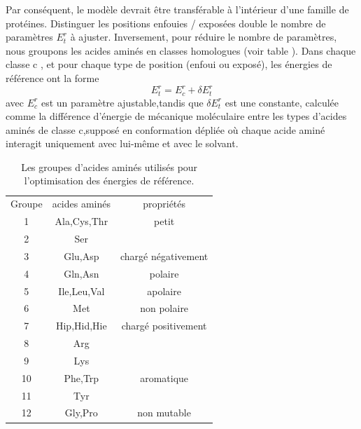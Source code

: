 Par conséquent, le modèle devrait être transférable à l'intérieur d'une famille de protéines. Distinguer les positions enfouies / exposées double le nombre de paramètres $E^r_t$ à ajuster. Inversement, pour réduire le nombre de paramètres, nous groupons les acides aminés en classes homologues (voir table ). Dans chaque classe c , et pour chaque type de position (enfoui ou exposé), les énergies de référence ont la forme
\begin{displaymath}
E^r_t = E^r_c + \delta E^r_t
\end{displaymath}
avec $E^r_c$ est un paramètre ajustable,tandis que $\delta E^r_t$ est une constante, calculée comme la différence d'énergie de mécanique moléculaire entre les types d'acides aminés de classe c,supposé en conformation dépliée où chaque acide aminé interagit uniquement avec lui-même et avec le solvant.

    \begin{table}[!htbp]
      \centering

      \begin{tabular}{ccc}

        \toprule
        Groupe & acides aminés & propriétés\\
        \cmidrule{1-3}

        1   & Ala,Cys,Thr & petit\\
        2   & Ser &\\
        \cmidrule{1-3}
        3   & Glu,Asp & chargé négativement\\
        \cmidrule{1-3}
        4   & Gln,Asn & polaire\\
        \cmidrule{1-3}
        5   & Ile,Leu,Val & apolaire\\
        \cmidrule{1-3}
        6   & Met & non polaire\\
        \cmidrule{1-3}
        7   & Hip,Hid,Hie & chargé positivement\\
        8   & Arg \\
        9   & Lys \\
        \cmidrule{1-3}
        10  & Phe,Trp & aromatique\\
        11  & Tyr \\
        \cmidrule{1-3}
        12  & Gly,Pro & non mutable\\
        \bottomrule


      \end{tabular}      
      \caption{Les groupes d'acides aminés utilisés pour l'optimisation des énergies de référence.}
\label{tab:AAgroups}      
    \end{table}


